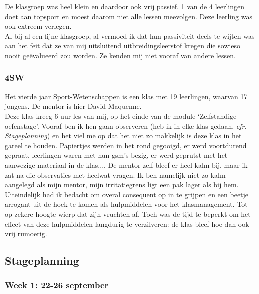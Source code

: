 \documentclass[a4paper,11pt]{article}
\theoremstyle{definition}
\begin{document}
\noindent De klasgroep was heel klein en daardoor ook vrij passief. 1 van de 4 leerlingen 
doet aan topsport en moest daarom niet alle lessen meevolgen. Deze leerling was 
ook extreem verlegen.\\

\noindent Al bij al een fijne klasgroep, al vermoed ik dat hun passiviteit deels te wijten 
was aan het feit dat ze van mij uitsluitend uitbreidingsleerstof kregen die 
sowieso nooit geëvalueerd zou worden. Ze kenden mij niet vooraf van andere 
lessen.

\subsubsection{4SW}\label{4SW}
Het vierde jaar Sport-Wetenschappen is een klas met 19 leerlingen, waarvan 17 
jongens. De mentor is hier David Maquenne.\\

\noindent Deze klas kreeg 6 uur les van mij, op het einde van de module `Zelfstandige 
oefenstage'. Vooraf ben ik hen gaan observeren (heb ik in elke klas gedaan, \emph{cfr. Stageplanning}) 
en het viel me op dat het niet zo makkelijk is deze klas in het gareel te houden. Papiertjes werden in het rond gegooigd, er werd voortdurend gepraat, 
leerlingen waren met hun gsm's bezig, er werd geprutst met het aanwezige materiaal in de 
klas,... De mentor zelf bleef er heel kalm bij, maar ik zat na die observaties met 
heelwat vragen. Ik ben namelijk niet zo kalm aangelegd als mijn mentor, mijn 
irritatiegrens ligt een pak lager als bij hem. \\

\noindent Uiteindelijk had ik bedacht om overal consequent op in te grijpen en een beetje 
arrogant uit de hoek te komen als hulpmiddelen voor het klasmanagement. Tot op 
zekere hoogte wierp dat zijn vruchten af. Toch was de tijd te beperkt om het effect van 
deze hulpmiddelen langdurig te verzilveren: de klas bleef hoe dan ook vrij rumoerig. \\


\subsection{Stageplanning}
\begin{center}
\end{center}
\subsubsection{Week 1: 22-26 september}
\newcommand{\klasvijf}[2]{\item\textcolor{ocre}{\textbf{5Wi8}}: #1 - #2}
\newcommand{\klaszes}[2]{\item\textcolor{ocre}{\textbf{6Wi8 (Sophie)}}: #1 - #2}
\newcommand{\klasklein}[2]{\item\textcolor{ocre}{\textbf{6Wi8 (Lieselotte)}}: #1 - #2}
\newcommand{\kutklas}[2]{\item\textcolor{ocre}{\textbf{4SW}}: #1 - #2}
\end{document}
